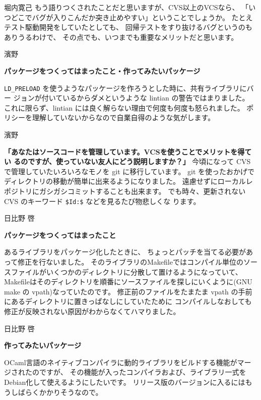 \documentclass[cjk,dvipdfmx,12pt]{beamer}
\begin{document}
\begin{frame}{堀内寛己}
もう語りつくされたことだと思いますが、CVS以上のVCSなら、
「いつどこでバグが入りこんだか突き止めやすい」ということでしょうか。
たとえテスト駆動開発をしていたとしても、
回帰テストをすり抜けるバグというのもありうるわけで、
その点でも、いつまでも重要なメリットだと思います。

\end{frame}\begin{frame}[containsverbatim]{濱野}

\textbf{パッケージをつくってはまったこと・作ってみたいパッケージ}

\verb!LD_PRELOAD! を使うようなパッケージを作ろうとした時に、共有ライブラリにバー
ジョンが付いているからダメというような lintian の警告ではまりました。
これに限らず、lintian には良く解らない理由で何度も何度も怒られました。
ポリシーを理解していないからなので自業自得のような気がします。

\end{frame}\begin{frame}[containsverbatim]{濱野}

\textbf{「あなたはソースコードを管理しています。VCSを使うことでメリットを得てい
るのですが、使っていない友人にどう説明しますか？」}
今頃になって CVS で管理していたいろいろなモノを git に移行しています。
git を使ったおかげでディレクトリの移動が簡単に出来るようになりました。
遠慮せずにローカルレポジトリにガシガシコミットすることも出来ます。
でも時々、更新されない CVS のキーワード \verb!$Id:$! などを見るたび物悲しくな
ります。

\end{frame}\begin{frame}{日比野 啓}

\textbf{パッケージをつくってはまったこと}

あるライブラリをパッケージ化したときに、
ちょっとパッチを当てる必要があって修正を行ないました。
そのライブラリのMakefileではコンパイル単位のソースファイルがいくつかのディレクトリに分散して置けるようになっていて、
Makefileはそのディレクトリを順番にソースファイルを探しにいくように(GNU make の vpath)なっていたのです。
修正前のファイルをたまたま vpath の手前にあるディレクトリに置きっぱなしにしていたために
コンパイルしなおしても修正が反映されない原因がわからなくてハマりました。

\end{frame}\begin{frame}{日比野 啓}

\textbf{作ってみたいパッケージ}

OCaml言語のネイティブコンパイラに動的ライブラリをビルドする機能がマージされたのですが、
その機能が入ったコンパイラおよび、ライブラリ一式をDebian化して使えるようにしたいです。
リリース版のバージョンに入るにはもうしばらくかかりそうなので。


\end{frame}
\end{document}
